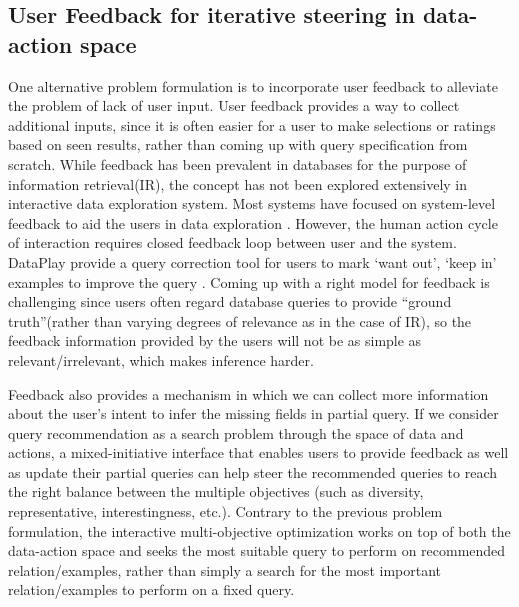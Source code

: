 \documentclass{sig-alternate-05-2015}
\begin{document}
\subsection{User Feedback for iterative steering in data-action space}
One alternative problem formulation is to incorporate user feedback to alleviate the problem of lack of user input. 
User feedback provides a way to collect additional inputs, since it is often easier for a user to make selections or ratings based on seen results, rather than coming up with query specification from scratch. While feedback has been prevalent in databases for the purpose of information retrieval(IR), the concept has not been explored extensively in interactive data exploration system. Most systems have focused on system-level feedback to aid the users in data exploration \cite{Nandi2013,Jiang2015}. However, the human action cycle of interaction requires closed feedback loop between user and the system\cite{Norman2013}. DataPlay provide a query correction tool for users to mark `want out', `keep in' examples to improve the query \cite{Abouzied2012}. Coming up with a right model for feedback is challenging since users often regard database queries to provide ``ground truth''(rather than varying degrees of relevance as in the case of IR), so the feedback information provided by the users will not be as simple as relevant/irrelevant, which makes inference harder.
\par Feedback also provides a mechanism in which we can collect more information about the user's intent to infer the missing fields in partial query. If we consider query recommendation as a search problem through the space of data and actions, a mixed-initiative interface that enables users to provide feedback as well as update their partial queries can help steer the recommended queries to reach the right balance between the multiple objectives (such as diversity, representative, interestingness, etc.). Contrary to the previous problem formulation, the interactive multi-objective optimization works on top of both the data-action space and seeks the most suitable query to perform on recommended relation/examples, rather than simply a search for the most important relation/examples to perform on a fixed query.
\end{document}
